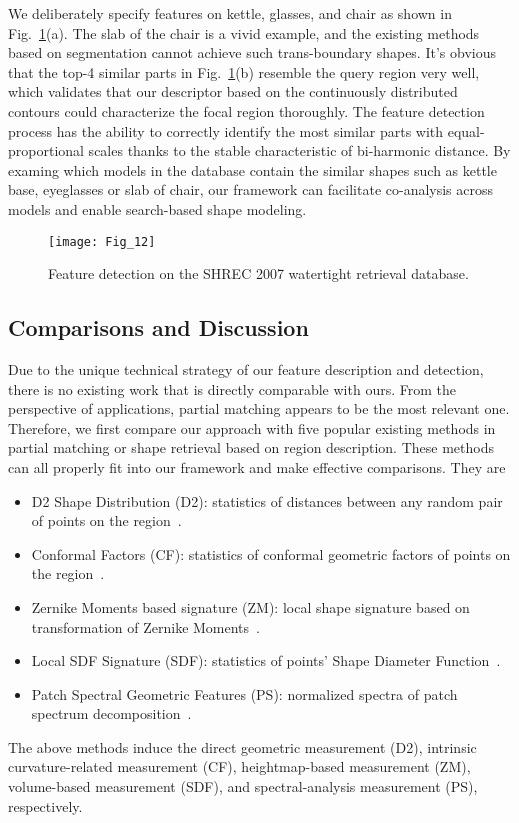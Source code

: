 We deliberately specify features on kettle, glasses, and chair as
shown in Fig.~\ref{detect_database_1}(a). The slab of the chair is a
vivid example, and the existing methods based on segmentation cannot
achieve such trans-boundary shapes. It's obvious that the top-4
similar parts in Fig.~\ref{detect_database_1}(b) resemble the query
region very well, which validates that our descriptor based on the
continuously distributed contours could characterize the focal region
thoroughly. The feature detection process has the ability to correctly
identify the most similar parts with equal-proportional scales thanks
to the stable characteristic of bi-harmonic distance. By examing which
models in the database contain the similar shapes such as kettle base,
eyeglasses or slab of chair, our framework can facilitate co-analysis
across models and enable search-based shape modeling.


\begin{figure}[!to]
\texttt{[image: Fig\_12]}
\caption[Feature detection on the SHREC 2007 watertight retrieval
  database.]
  {Feature detection on the SHREC 2007 watertight retrieval
  database.}
\label{detect_database_1}
\end{figure}

\subsection{Comparisons and Discussion}
\label{sec:App}

Due to the unique technical strategy of our feature description and
detection, there is no existing work that is directly comparable with
ours. From the perspective of applications, partial matching appears
to be the most relevant one. Therefore, we first compare our approach
with five popular existing methods in partial matching or shape
retrieval based on region description. These methods can all properly
fit into our framework and make effective comparisons. They are
\begin{itemize}
\item D2 Shape Distribution (D2): statistics of distances between any
      random pair of points on the region~\cite{Osada:2002}.
\item Conformal Factors (CF): statistics of conformal geometric factors
      of points on the region~\cite{Ben-Chen:2008}.
\item Zernike Moments based signature (ZM): local shape signature based
      on transformation of Zernike Moments~\cite{Maximo:2011:RRI:2027471}.
\item Local SDF Signature (SDF): statistics of points' Shape Diameter
      Function~\cite{Shapira:2010}.
\item Patch Spectral Geometric Features (PS): normalized spectra of patch
      spectrum decomposition~\cite{Hu2009}.
\end{itemize}
The above methods induce the direct geometric measurement (D2), intrinsic
curvature-related measurement (CF), heightmap-based measurement (ZM),
volume-based measurement (SDF), and spectral-analysis measurement (PS),
respectively.

